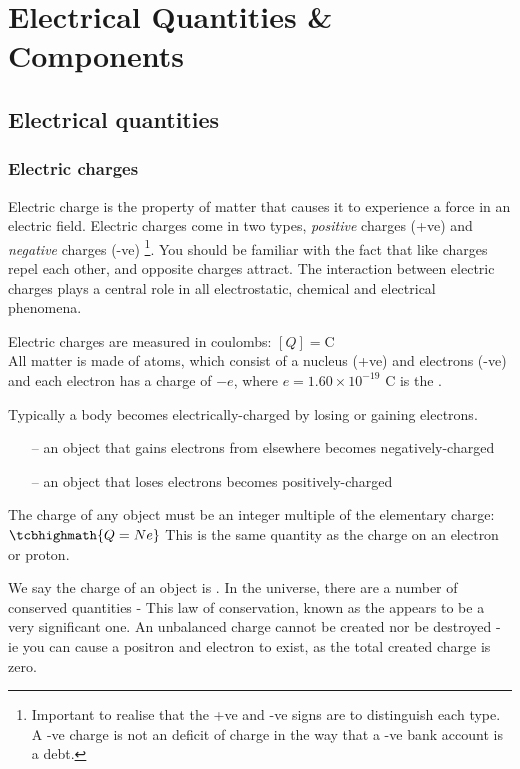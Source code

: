 \chapter{Electrical Quantities \& Components}

\section{Electrical quantities}

\subsection{Electric charges}

Electric charge is the property of matter that causes it to experience a force in an electric field.  Electric charges come in two types, \emph{positive} charges (+ve) and \emph{negative} charges (-ve) \footnote{Important to realise that the +ve and -ve signs are to distinguish each type. A -ve charge is not an deficit of charge in the way that a -ve bank account is a debt.}. You should be familiar with the fact that like charges repel each other, and opposite charges attract. The interaction between electric charges plays a central role in all electrostatic, chemical and electrical phenomena.

Electric charges are measured in coulombs: $[Q] = \text{C}$\\

All matter is made of atoms, which consist of a nucleus (+ve) and electrons (-ve) and each electron has a charge of $-e$, where $e=1.60\times10^{-19}\text{ C}$ is the .

Typically a body becomes electrically-charged by losing or gaining electrons.

\begin{itemize}
	\item[--] an object that gains electrons from elsewhere becomes negatively-charged
	
	\item[--] an object that loses electrons becomes positively-charged
\end{itemize}


The charge of any object must be an integer multiple of the elementary charge: $\tcbhighmath{Q=Ne}$ This is the same quantity as the charge on an electron or proton.

We say the charge of an object is . In the universe, there are a number of conserved quantities - This law of conservation, known as the  appears to be a very significant one. An unbalanced charge cannot be created nor be destroyed - ie you can cause a positron and electron to exist, as the total created charge is zero.


